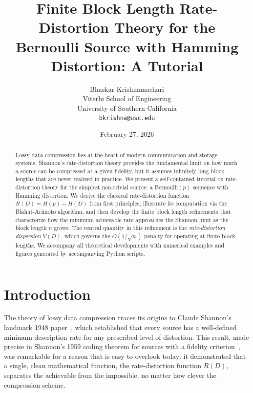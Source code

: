 \documentclass[11pt]{article}
\title{\LARGE Finite Block Length Rate-Distortion Theory for the\\Bernoulli Source with Hamming Distortion: A Tutorial}
\author{Bhaskar Krishnamachari\\[4pt]
{\normalsize Viterbi School of Engineering}\\
{\normalsize University of Southern California}\\[2pt]
{\normalsize \texttt{bkrishna@usc.edu}}}
\date{\normalsize February 27, 2026}
\newcommand{\RD}{R(D)}
\newcommand{\Hp}{H(p)}
\newcommand{\HD}{H(D)}
\begin{document}
\maketitle

\begin{abstract}
Lossy data compression lies at the heart of modern communication and storage systems.
Shannon's rate-distortion theory provides the fundamental limit on how much a source
can be compressed at a given fidelity, but it assumes infinitely long block lengths
that are never realized in practice.
We present a self-contained tutorial on rate-distortion theory for the simplest
non-trivial source: a Bernoulli$(p)$ sequence with Hamming distortion.
We derive the classical rate-distortion function $\RD = \Hp - \HD$ from first
principles, illustrate its computation via the Blahut-Arimoto algorithm, and then
develop the finite block length refinements that characterize how the minimum
achievable rate approaches the Shannon limit as the block length $n$ grows.
The central quantity in this refinement is the \emph{rate-distortion dispersion}
$V(D)$, which governs the $O(1/\sqrt{n})$ penalty for operating at finite block
lengths.
We accompany all theoretical developments with numerical examples and figures
generated by accompanying Python scripts.
\end{abstract}

\section{Introduction}
\label{sec:introduction}

The theory of lossy data compression traces its origins to Claude Shannon's
landmark 1948 paper~\cite{shannon1948}, which established that every source has
a well-defined minimum description rate for any prescribed level of
distortion.
This result, made precise in Shannon's 1959 coding theorem for sources with a
fidelity criterion~\cite{shannon1959}, was remarkable for a reason that is easy
to overlook today: it demonstrated that a single, clean mathematical function,
the rate-distortion function $\RD$, separates the achievable from the impossible, no
matter how clever the compression scheme.
\end{document}
